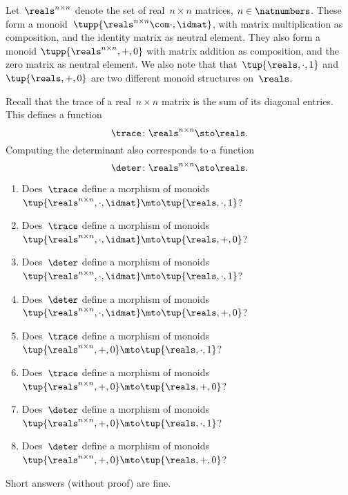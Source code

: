 \begin{gradedexercise}
    \label{ex:TraceAndDeterminant}
    Let~$\reals^{n \times n}$ denote the set of real~$n \times n$ matrices, $n \in \natnumbers$.
        These form a monoid~$\tupp{\reals^{n \times n}\com \cdot, \idmat}$, with matrix multiplication as composition, and the identity matrix as neutral element.
        They also form a monoid $\tupp{\reals^{n \times n}, {{+}}, 0}$ with matrix addition as composition, and the zero matrix as neutral element. We also note that that~$\tup{\reals, {{\cdot}}, 1}$ and~$\tup{\reals, {{+}}, 0}$ are two different monoid structures on~$\reals$.

        Recall that the trace of a real~$n \times n$ matrix is the sum of its diagonal entries.
        This defines a function
        \begin{equation}
            \trace \colon \reals^{n \times n} \sto \reals.
        \end{equation}
        Computing the determinant also corresponds to a function
        \begin{equation}
            \deter \colon \reals^{n \times n} \sto \reals.
        \end{equation}
        
        \begin{enumerate}
            \item Does~$\trace$ define a morphism of monoids~$\tup{\reals^{n \times n}, {{\cdot}},  \idmat} \mto \tup{\reals, {{\cdot}},  1}$?
            \item Does~$\trace$ define a morphism of monoids~$\tup{\reals^{n \times n}, {{\cdot}},  \idmat} \mto \tup{\reals, {{+}},  0}$?
            \item Does~$\deter$ define a morphism of monoids~$\tup{\reals^{n \times n}, {{\cdot}},  \idmat} \mto \tup{\reals, {{\cdot}},  1}$?
            \item Does~$\deter$ define a morphism of monoids~$\tup{\reals^{n \times n}, {{\cdot}},  \idmat} \mto \tup{\reals, {{+}},  0}$?
            \item Does~$\trace$ define a morphism of monoids~$\tup{\reals^{n \times n}, {{+}},  0} \mto \tup{\reals, {{\cdot}},  1}$?
            \item Does~$\trace$ define a morphism of monoids~$\tup{\reals^{n \times n}, {{+}},  0} \mto \tup{\reals, {{+}},  0}$?
            \item Does~$\deter$ define a morphism of monoids~$\tup{\reals^{n \times n}, {{+}},  0} \mto \tup{\reals, {{\cdot}},  1}$?
            \item Does~$\deter$ define a morphism of monoids~$\tup{\reals^{n \times n}, {{+}},  0} \mto \tup{\reals, {{+}},  0}$?
        \end{enumerate}
        Short answers (without proof) are fine.
\end{gradedexercise}


